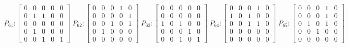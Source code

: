     $$
        P_{61} : \begin{bmatrix}
            0 & 0 & 0 & 0 & 0 \\
            0 & 1 & 1 & 0 & 0 \\
            0 & 0 & 0 & 0 & 0 \\
            0 & 1 & 0 & 0 & 0 \\
            0 & 0 & 1 & 0 & 1
        \end{bmatrix}
        \;
        P_{62} : \begin{bmatrix}
            0 & 0 & 0 & 1 & 0 \\
            0 & 0 & 0 & 0 & 1 \\
            0 & 0 & 1 & 0 & 1 \\
            0 & 1 & 0 & 0 & 0 \\
            0 & 0 & 0 & 0 & 0
        \end{bmatrix}
        \;
        P_{63} : \begin{bmatrix}
            0 & 0 & 0 & 0 & 0 \\
            0 & 0 & 0 & 0 & 0 \\
            1 & 0 & 1 & 0 & 0 \\
            0 & 0 & 0 & 1 & 0 \\
            0 & 0 & 1 & 0 & 1
        \end{bmatrix}
        \;
        P_{64} : \begin{bmatrix}
            0 & 0 & 0 & 1 & 0 \\
            1 & 0 & 1 & 0 & 0 \\
            0 & 0 & 1 & 1 & 0 \\
            0 & 0 & 0 & 0 & 0 \\
            0 & 0 & 0 & 0 & 0
        \end{bmatrix}
        \;
        P_{65} : \begin{bmatrix}
            0 & 0 & 0 & 1 & 0 \\
            0 & 0 & 0 & 1 & 0 \\
            0 & 1 & 0 & 1 & 0 \\
            0 & 0 & 1 & 0 & 0 \\
            0 & 0 & 0 & 0 & 0
        \end{bmatrix}
    $$

